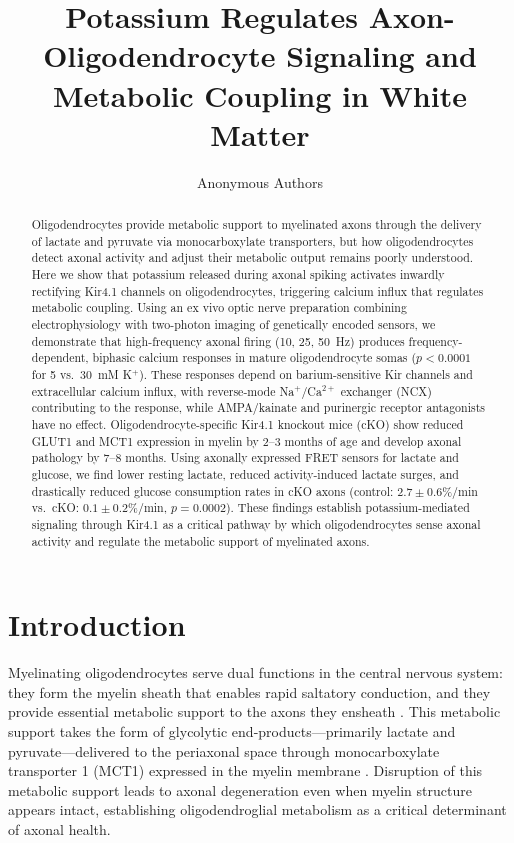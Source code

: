 \documentclass[12pt]{article}
\title{Potassium Regulates Axon-Oligodendrocyte Signaling and Metabolic Coupling in White Matter}
\author{Anonymous Authors}
\date{}
\begin{document}
\maketitle

\begin{abstract}
Oligodendrocytes provide metabolic support to myelinated axons through the delivery of lactate and pyruvate via monocarboxylate transporters, but how oligodendrocytes detect axonal activity and adjust their metabolic output remains poorly understood. Here we show that potassium released during axonal spiking activates inwardly rectifying Kir4.1 channels on oligodendrocytes, triggering calcium influx that regulates metabolic coupling. Using an ex vivo optic nerve preparation combining electrophysiology with two-photon imaging of genetically encoded sensors, we demonstrate that high-frequency axonal firing (10, 25, 50~Hz) produces frequency-dependent, biphasic calcium responses in mature oligodendrocyte somas ($p < 0.0001$ for 5 vs.\ 30~mM K$^+$). These responses depend on barium-sensitive Kir channels and extracellular calcium influx, with reverse-mode Na$^+$/Ca$^{2+}$ exchanger (NCX) contributing to the response, while AMPA/kainate and purinergic receptor antagonists have no effect. Oligodendrocyte-specific Kir4.1 knockout mice (cKO) show reduced GLUT1 and MCT1 expression in myelin by 2--3 months of age and develop axonal pathology by 7--8 months. Using axonally expressed FRET sensors for lactate and glucose, we find lower resting lactate, reduced activity-induced lactate surges, and drastically reduced glucose consumption rates in cKO axons (control: $2.7 \pm 0.6$\%/min vs.\ cKO: $0.1 \pm 0.2$\%/min, $p = 0.0002$). These findings establish potassium-mediated signaling through Kir4.1 as a critical pathway by which oligodendrocytes sense axonal activity and regulate the metabolic support of myelinated axons.
\end{abstract}

\section{Introduction}

Myelinating oligodendrocytes serve dual functions in the central nervous system: they form the myelin sheath that enables rapid saltatory conduction, and they provide essential metabolic support to the axons they ensheath \citep{nave2010myelination, funfschilling2012glycolytic}. This metabolic support takes the form of glycolytic end-products---primarily lactate and pyruvate---delivered to the periaxonal space through monocarboxylate transporter 1 (MCT1) expressed in the myelin membrane \citep{lee2012oligodendroglia, philips2017oligodendroglia}. Disruption of this metabolic support leads to axonal degeneration even when myelin structure appears intact, establishing oligodendroglial metabolism as a critical determinant of axonal health.
\end{document}
